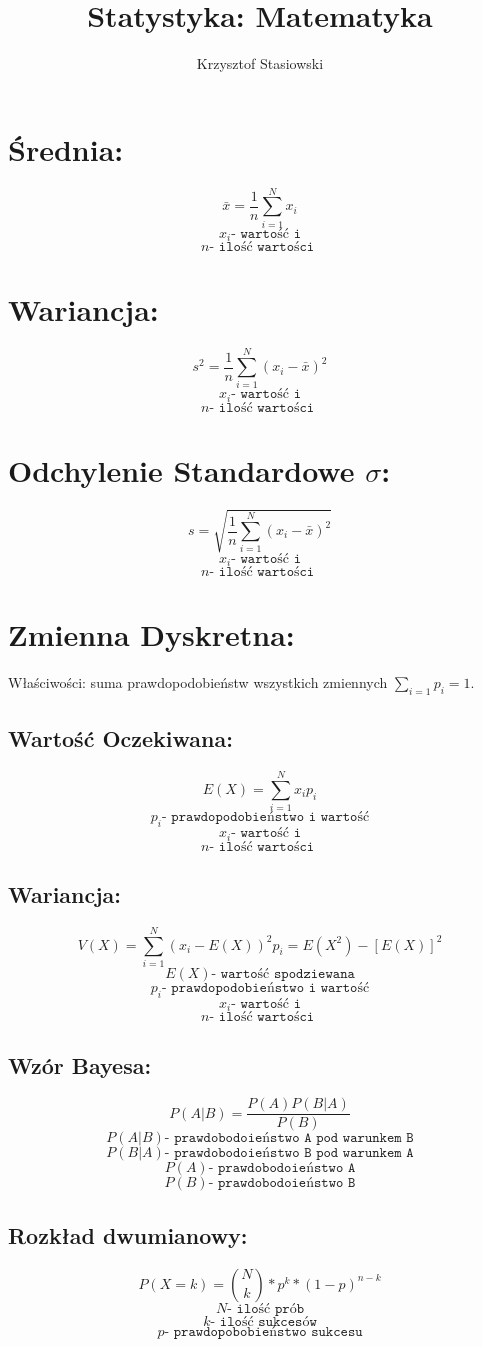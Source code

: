 \documentclass[fleqn]{article}
\title{Statystyka: Matematyka}
\author{Krzysztof Stasiowski}
\date{}
\begin{document}
\section*{Średnia:}
\[\bar{x} = \frac{1}{n}\sum_{i=1}^Nx_i\]
\[x_i \texttt{- wartość i}\]
\[n   \texttt{- ilość wartości }\]

\section*{Wariancja:}
\[s^2 = \frac{1}{n}\sum_{i=1}^N(x_i-\bar{x})^2\]
\[x_i \texttt{- wartość i}\]
\[n   \texttt{- ilość wartości }\]

\section*{Odchylenie Standardowe \(\sigma\):}
\[s = \sqrt{\frac{1}{n}\sum_{i=1}^N(x_i-\bar{x})^2}\]
\[x_i \texttt{- wartość i}\]
\[n   \texttt{- ilość wartości }\]

\pagebreak
\section*{Zmienna Dyskretna:}
Właściwości: suma prawdopodobieństw wszystkich zmiennych \(\sum_{i=1}{p_i}=1\).
\subsection*{Wartość Oczekiwana:}
\[E(X) = \sum_{i=1}^Nx_ip_i\]
\[p_i \texttt{- prawdopodobieństwo i wartość}\]
\[x_i \texttt{- wartość i}\]
\[n   \texttt{- ilość wartości }\]
\subsection*{Wariancja:}
\[V(X) = \sum_{i=1}^N(x_i-E(X))^2p_i = E(X^2) - [E(X)]^2\]
\[E(X) \texttt{- wartość spodziewana}\]
\[p_i \texttt{- prawdopodobieństwo i wartość}\]
\[x_i \texttt{- wartość i}\]
\[n   \texttt{- ilość wartości }\]
\subsection*{Wzór Bayesa:}
\[P(A|B) = \frac{P(A)P(B|A)}{P(B)}\]
\[P(A|B) \texttt{- prawdobodoieństwo A pod warunkem B}\]
\[P(B|A) \texttt{- prawdobodoieństwo B pod warunkem A}\]
\[P(A)   \texttt{- prawdobodoieństwo A}\]
\[P(B)   \texttt{- prawdobodoieństwo B}\]

\subsection*{Rozkład dwumianowy:}
\[P(X=k) = \binom{N}{k}*p^k*(1-p)^{n-k}\]
\[N \texttt{- ilość prób}\]
\[k \texttt{- ilość sukcesów}\]
\[p \texttt{- prawdopobobieństwo sukcesu}\]
\end{document}

